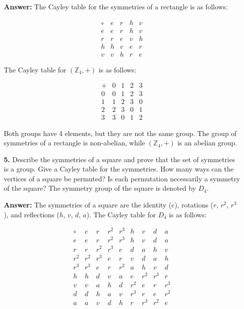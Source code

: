 \documentclass[12pt,reqno]{amsart}
\begin{document}
\begin{enumerate}
\textbf{Answer:} The Cayley table for the symmetries of a rectangle is as follows:

\[
\begin{array}{c|cccc}
\circ & e & r & h & v \\
\hline
e & e & r & h & v \\
r & r & e & v & h \\
h & h & v & e & r \\
v & v & h & r & e
\end{array}
\]

The Cayley table for $({\mathbb Z}_4, +)$ is as follows:

\[
\begin{array}{c|cccc}
+ & 0 & 1 & 2 & 3 \\
\hline
0 & 0 & 1 & 2 & 3 \\
1 & 1 & 2 & 3 & 0 \\
2 & 2 & 3 & 0 & 1 \\
3 & 3 & 0 & 1 & 2
\end{array}
\]

Both groups have 4 elements, but they are not the same group. The group of symmetries of a rectangle is non-abelian, while $({\mathbb Z}_4, +)$ is an abelian group.

\medskip

\item[{\bf 5.}]
Describe the symmetries of a square and prove that the set of
symmetries is a group. Give a Cayley table for the symmetries. How
many ways can the vertices of a square be permuted?  Is each
permutation necessarily a symmetry of the square?  The symmetry group
of the square is denoted by $D_4$.

\textbf{Answer:} The symmetries of a square are the identity ($e$), rotations ($r$, $r^2$, $r^3$), and reflections ($h$, $v$, $d$, $a$). The Cayley table for $D_4$ is as follows:

\[
\begin{array}{c|cccccccc}
\circ & e & r & r^2 & r^3 & h & v & d & a \\
\hline
e & e & r & r^2 & r^3 & h & v & d & a \\
r & r & r^2 & r^3 & e & d & a & h & v \\
r^2 & r^2 & r^3 & e & r & v & d & a & h \\
r^3 & r^3 & e & r & r^2 & a & h & v & d \\
h & h & d & v & a & e & r^2 & r^3 & r \\
v & v & a & h & d & r^2 & e & r & r^3 \\
d & d & h & a & v & r^3 & r & e & r^2 \\
a & a & v & d & h & r & r^3 & r^2 & e
\end{array}
\]


\end{enumerate}
\end{document}
